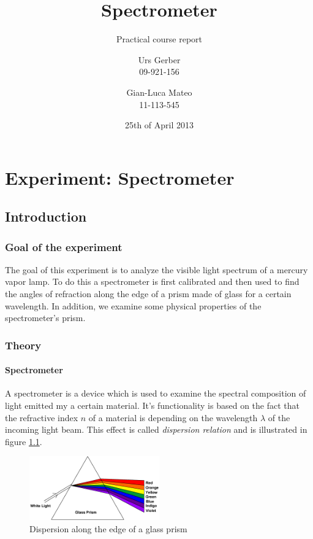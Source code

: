 \documentclass{scrreprt}
\author{Urs Gerber\\09-921-156 \and Gian-Luca Mateo\\11-113-545}
\date{25th of April 2013}
\title{Spectrometer}
\subtitle{Practical course report}
\begin{document}
\maketitle

\tableofcontents
\newpage

\chapter{Experiment: Spectrometer}

\section{Introduction}

\subsection{Goal of the experiment}
The goal of this experiment is to analyze the visible light spectrum of a mercury vapor lamp. To do this a spectrometer is first calibrated and then used to find the angles of refraction along the edge of a prism made of glass for a certain wavelength. In addition, we examine some physical properties of the spectrometer's prism.
 
\subsection{Theory}
\subsubsection{Spectrometer}
A spectrometer is a device which is used to examine the spectral composition of light emitted my a certain material. It's functionality is based on the fact that the refractive index $n$ of a material is depending on the wavelength $\lambda$ of the incoming light beam. This effect is called \emph{dispersion relation} and is illustrated in figure \ref{fig:dispersion}.\\

\begin{figure}[h]
	\centering
  \includegraphics[width=0.5\textwidth]{img/dispersion.png}
	\caption{Dispersion along the edge of a glass prism}
	\label{fig:dispersion}
\end{figure}
\end{document}
